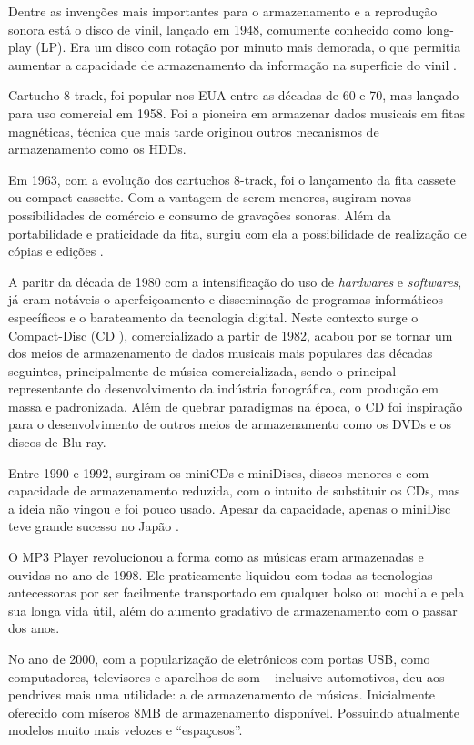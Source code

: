 Dentre as invenções mais importantes para o armazenamento e a reprodução sonora está o disco de vinil, lançado em 1948, comumente conhecido como long-play (LP). Era um disco com rotação por minuto mais demorada, o que permitia aumentar a capacidade de armazenamento da informação na superficie do vinil \cite{marchi2005}.

Cartucho 8-track, foi popular nos EUA entre as décadas de 60 e 70, mas lançado para uso comercial em 1958. Foi a pioneira em armazenar dados musicais em fitas magnéticas, técnica que mais tarde originou outros mecanismos de armazenamento como os HDDs.

Em 1963, com a evolução dos cartuchos 8-track, foi o lançamento da fita cassete ou compact cassette. Com a vantagem de serem menores, sugiram novas possibilidades de comércio e consumo de gravações sonoras. Além da portabilidade e praticidade da fita, surgiu com ela a possibilidade de realização de cópias e edições \cite{marchi2005}.

A paritr da década de 1980 com a intensificação do uso de \textit{hardwares} e \textit{softwares}, já eram notáveis o aperfeiçoamento e disseminação de programas informáticos específicos e o barateamento da tecnologia digital. Neste contexto surge o Compact-Disc (CD ), comercializado a partir de 1982, acabou por se tornar um dos meios de armazenamento de dados musicais mais populares das décadas seguintes, principalmente de música comercializada, sendo o principal representante do desenvolvimento da indústria fonográfica, com produção em massa e padronizada. Além de quebrar paradigmas na época, o CD foi inspiração para o desenvolvimento de outros meios de armazenamento como os DVDs e os discos de Blu-ray.

Entre 1990 e 1992, surgiram os miniCDs e miniDiscs, discos menores e com capacidade de armazenamento reduzida, com o intuito de substituir os CDs, mas a ideia não vingou e foi pouco usado. Apesar da capacidade, apenas o miniDisc teve grande sucesso no Japão \cite{marchi2005}.

O MP3 Player revolucionou a forma como as músicas eram armazenadas e ouvidas no ano de 1998. Ele praticamente liquidou com todas as tecnologias antecessoras por ser facilmente transportado em qualquer bolso ou mochila e pela sua longa vida útil, além do aumento gradativo de armazenamento com o passar dos anos.

No ano de 2000, com a popularização de eletrônicos com portas USB, como computadores, televisores e aparelhos de som – inclusive automotivos, deu aos pendrives mais uma utilidade: a de armazenamento de músicas. Inicialmente oferecido com míseros 8MB de armazenamento disponível. Possuindo atualmente modelos muito mais velozes e “espaçosos”.

